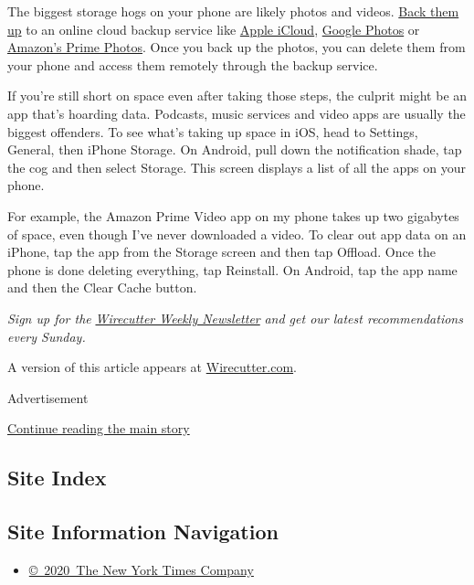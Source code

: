 The biggest storage hogs on your phone are likely photos and videos.
\href{https://www.nytimes.com/2018/01/11/smarter-living/backing-up-your-photos.html}{Back
them up} to an online cloud backup service like
\href{https://www.apple.com/icloud/photos/}{Apple iCloud},
\href{https://photos.google.com/}{Google Photos} or
\href{https://www.amazon.com/Cloud-Drive-Storage/b?ie=UTF8\&node=13234696011}{Amazon's
Prime Photos}. Once you back up the photos, you can delete them from
your phone and access them remotely through the backup service.

If you're still short on space even after taking those steps, the
culprit might be an app that's hoarding data. Podcasts, music services
and video apps are usually the biggest offenders. To see what's taking
up space in iOS, head to Settings, General, then iPhone Storage. On
Android, pull down the notification shade, tap the cog and then select
Storage. This screen displays a list of all the apps on your phone.

For example, the Amazon Prime Video app on my phone takes up two
gigabytes of space, even though I've never downloaded a video. To clear
out app data on an iPhone, tap the app from the Storage screen and then
tap Offload. Once the phone is done deleting everything, tap Reinstall.
On Android, tap the app name and then the Clear Cache button.

\emph{Sign up for the}
\href{https://thewirecutter.us5.list-manage.com/subscribe?u=570aa9140d54361ad5a594320\&id=bb5d08fe40}{\emph{Wirecutter
Weekly Newsletter}} \emph{and get our latest recommendations every
Sunday.}

A version of this article appears at
\href{https://thewirecutter.com/blog/how-to-declutter-your-phone/}{Wirecutter.com}.

Advertisement

\protect\hyperlink{after-bottom}{Continue reading the main story}

\hypertarget{site-index}{%
\subsection{Site Index}\label{site-index}}

\hypertarget{site-information-navigation}{%
\subsection{Site Information
Navigation}\label{site-information-navigation}}

\begin{itemize}
\tightlist
\item
  \href{https://help.nytimes.com/hc/en-us/articles/115014792127-Copyright-notice}{©~2020~The
  New York Times Company}
\end{itemize}

